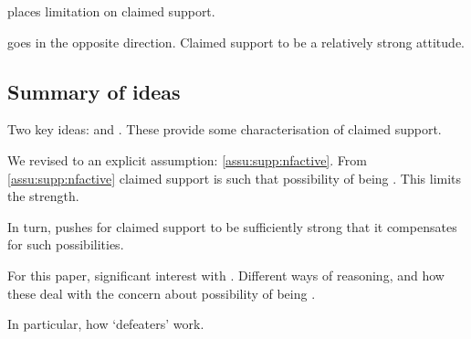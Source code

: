 \begin{note}
  \ideaCSA{} places limitation on claimed support.

  \ideaCSB{} goes in the opposite direction.
  Claimed support to be a relatively strong attitude.
\end{note}

\subsection{Summary of ideas}
\label{sec:summary-1}

\begin{note}
  Two key ideas: \ideaCSA{} and \ideaCSB{}.
  These provide some characterisation of claimed support.

  We revised \ideaCSA{} to an explicit assumption: \autoref{assu:supp:nfactive}.
  From \autoref{assu:supp:nfactive} claimed support is such that possibility of being \mom{}.
  This limits the strength.

  In turn, \ideaCSB{} pushes for claimed support to be sufficiently strong that it compensates for such possibilities.

  For this paper, significant interest with \ideaCSB{}.
  Different ways of reasoning, and how these deal with the concern about possibility of being \mom{}.

  In particular, how `defeaters' work.
\end{note}

